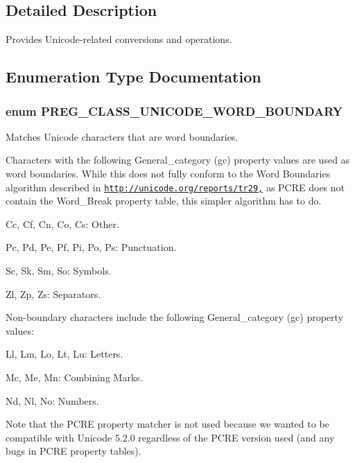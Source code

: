 \subsection{Detailed Description}
Provides Unicode-\/related conversions and operations. 

\subsection{Enumeration Type Documentation}
\hypertarget{unicode_8inc_ab7e2c4336deae5e6d3798a4f96c38395}{
\subsubsection[{PREG\_\-CLASS\_\-UNICODE\_\-WORD\_\-BOUNDARY}]{\setlength{\rightskip}{0pt plus 5cm}enum {\bf PREG\_\-CLASS\_\-UNICODE\_\-WORD\_\-BOUNDARY}}}
\label{unicode_8inc_ab7e2c4336deae5e6d3798a4f96c38395}
Matches Unicode characters that are word boundaries.

Characters with the following General\_\-category (gc) property values are used as word boundaries. While this does not fully conform to the Word Boundaries algorithm described in \href{http://unicode.org/reports/tr29,}{\tt http://unicode.org/reports/tr29,} as PCRE does not contain the Word\_\-Break property table, this simpler algorithm has to do.
\begin{DoxyItemize}
\item Cc, Cf, Cn, Co, Cs: Other.
\item Pc, Pd, Pe, Pf, Pi, Po, Ps: Punctuation.
\item Sc, Sk, Sm, So: Symbols.
\item Zl, Zp, Zs: Separators.
\end{DoxyItemize}

Non-\/boundary characters include the following General\_\-category (gc) property values:
\begin{DoxyItemize}
\item Ll, Lm, Lo, Lt, Lu: Letters.
\item Mc, Me, Mn: Combining Marks.
\item Nd, Nl, No: Numbers.
\end{DoxyItemize}

Note that the PCRE property matcher is not used because we wanted to be compatible with Unicode 5.2.0 regardless of the PCRE version used (and any bugs in PCRE property tables).

